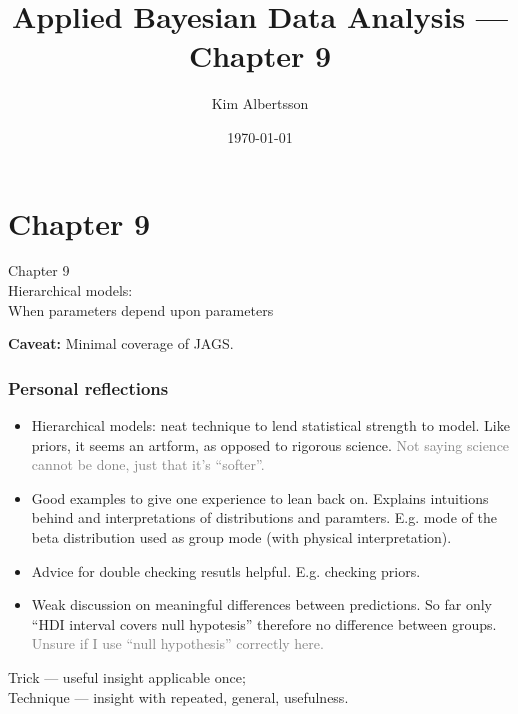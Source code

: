 \documentclass[usenames,dvipsnames,table]{beamer}
\title[ABDA Ch 9]{Applied Bayesian Data Analysis --- Chapter 9}
\author{Kim Albertsson} %
\institute[LTU and CERN]
{
CERN and Luleå University of Technology \\
\medskip
\textit{kim.albertsson@ltu.se}
}
\date{\today}
\begin{document}
\begin{frame}
\titlepage %
\end{frame}


\section{Chapter 9}
\begin{frame}
\begin{center}
{\huge{Chapter 9}}
\\\vspace{2em}
Hierarchical models:\\
When parameters depend upon parameters

\vspace{5em}
{\small\textbf{Caveat:} Minimal coverage of JAGS.}
\end{center}
\end{frame}

\begin{frame}
\frametitle{Personal reflections}
\begin{itemize}
\item Hierarchical models: neat technique to lend statistical strength to model. Like priors, it seems an artform, as opposed to rigorous science. \textcolor{gray}{Not saying science cannot be done, just that it's ``softer''.}

\item Good examples to give one experience to lean back on. Explains intuitions behind and interpretations of distributions and paramters. E.g. mode of the beta distribution used as group mode (with physical interpretation).

\item Advice for double checking resutls helpful. E.g. checking priors.

\item Weak discussion on meaningful differences between predictions. So far only ``HDI interval covers null hypotesis'' therefore no difference between groups. \textcolor{gray}{Unsure if I use ``null hypothesis'' correctly here.}
\end{itemize}

\vspace{3em}
\begin{center}
\small%
Trick --- useful insight applicable once;\\
Technique --- insight with repeated, general, usefulness.
\end{center}
\end{frame}
\end{document}
